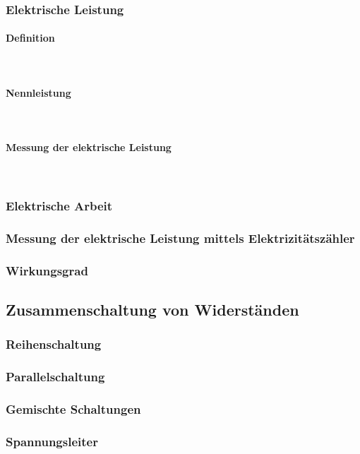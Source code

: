 	\subsubsection{Elektrische Leistung}
		\paragraph{Definition}~\\
		\paragraph{Nennleistung}~\\
		\paragraph{Messung der elektrische Leistung}~\\
	\subsubsection{Elektrische Arbeit}
	\subsubsection{Messung der elektrische Leistung mittels Elektrizitätszähler}
	\subsubsection{Wirkungsgrad}
	

\subsection{Zusammenschaltung von Widerständen}
\subsubsection{Reihenschaltung}
\subsubsection{Parallelschaltung}
\subsubsection{Gemischte Schaltungen}
\subsubsection{Spannungsleiter}
